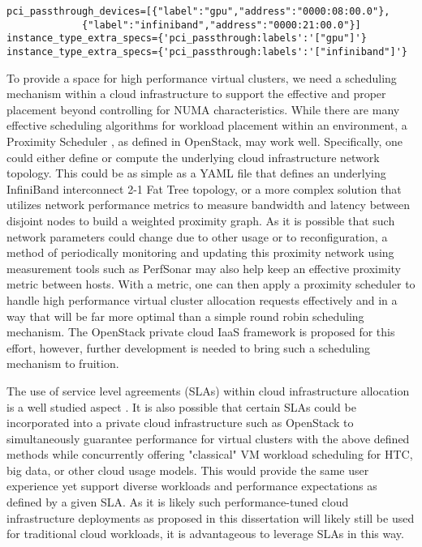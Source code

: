 \begin{verbatim}
pci_passthrough_devices=[{"label":"gpu","address":"0000:08:00.0"},
			 {"label":"infiniband","address":"0000:21:00.0"}]
instance_type_extra_specs={'pci_passthrough:labels':'["gpu"]'}
instance_type_extra_specs={'pci_passthrough:labels':'["infiniband"]'}
\end{verbatim}
 

To provide a space for high performance virtual clusters, we need a scheduling mechanism within a cloud infrastructure to support the effective and proper placement beyond controlling for NUMA characteristics. While there are many effective scheduling algorithms for workload placement within an environment, a Proximity Scheduler \cite{www-proximity-scheduler}, as defined in OpenStack, may work well. Specifically, one could either define or compute the underlying cloud infrastructure network topology. This could be as simple as a YAML file that defines an underlying InfiniBand interconnect 2-1 Fat Tree topology, or a more complex solution that utilizes network performance metrics to measure bandwidth and latency between disjoint nodes to build a weighted proximity graph. As it is possible that such network parameters could change due to other usage or to reconfiguration, a method of periodically monitoring and updating this proximity network using measurement tools such as PerfSonar \cite{hanemann2005perfsonar} may also help keep an effective proximity metric between hosts. With a metric, one can then apply a proximity scheduler to handle high performance virtual cluster allocation requests effectively and in a way that will be far more optimal than a simple round robin scheduling mechanism. The OpenStack private cloud IaaS framework is proposed for this effort, however, further development is needed to bring such a scheduling mechanism to fruition.  

The use of service level agreements (SLAs) within cloud infrastructure allocation is a well studied aspect \cite{serrano2013towards}.  It is also possible that certain SLAs could be incorporated into a private cloud infrastructure such as OpenStack to simultaneously guarantee performance for virtual clusters with the above defined methods while concurrently offering "classical" VM workload scheduling for HTC, big data, or other cloud usage models. This would provide the same user experience yet support diverse workloads and performance expectations as defined by a given SLA. As it is likely such performance-tuned cloud infrastructure deployments as proposed in this dissertation will likely still be used for traditional cloud workloads, it is advantageous to leverage SLAs in this way.   

